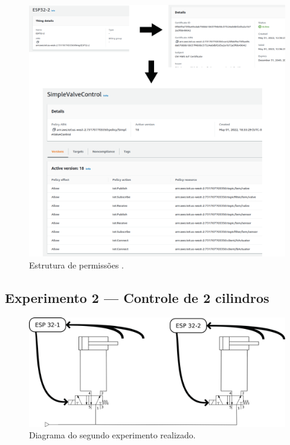 \begin{figure}[htb]
    \begin{center}
	    \includegraphics[scale=0.5]{figs/cert_flow.png}
	\end{center}
	\caption{\label{fig:cert1} Estrutura de permissões .} 
\end{figure}


\subsection{Experimento 2 — Controle de 2 cilindros}


\begin{figure}[htb]
    \begin{center}
	    \includegraphics[scale=0.5]{figs/diag_exp2.png}
	\end{center}
	\caption{\label{fig:exp2} Diagrama do segundo experimento realizado.} 
\end{figure}

